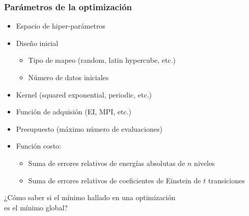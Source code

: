 \documentclass{beamer}
\begin{document}
\begin{frame}[t]
\frametitle{Parámetros de la optimización}

\begin{itemize}
\item Espacio de hiper-parámetros
\item Diseño inicial
  \begin{itemize}
    \item Tipo de mapeo (random, latin hypercube, etc.)
    \item Número de datos iniciales
  \end{itemize}
\item Kernel (squared exponential, periodic, etc.)
\item Función de adquisión (EI, MPI, etc.)
\item Presupuesto (máximo número de evaluaciones)
\item Función costo: 
  \begin{itemize}
    \item Suma de errores relativos de energías absolutas de $n$ niveles
    \item Suma de errores relativos de coeficientes de Einstein de $t$ transiciones
  \end{itemize}
\end{itemize}

\begin{center}
¿Cómo saber si el mínimo hallado en una optimización \\ es el mínimo global?

\medskip
\color{red}{
$\rightarrow$ Evaluación del modelo usando 100 semillas diferentes $\leftarrow$}
\end{center}

\end{frame}
\end{document}
